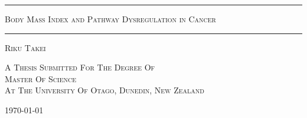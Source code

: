 \begin{titlepage}

\centering

\rule[2.0mm]{\textwidth}{0.5mm}

\begin{doublespace}
    {\Huge \scshape Body Mass Index and Pathway Dysregulation in Cancer}
\end{doublespace}

\rule[2.0mm]{\textwidth}{0.5mm}

\vspace{2.0mm}
{\Large \scshape Riku Takei}

\vfill

{\normalsize \scshape A Thesis Submitted For The Degree Of\\}
{\Large \scshape Master Of Science\\}
\vspace{2.0mm}
{\normalsize \scshape At The University Of Otago, Dunedin, New Zealand \\}

\vspace{10.0mm}
{\normalsize \today}

\end{titlepage}
